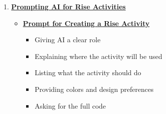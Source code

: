 \documentclass{article}
\begin{document}
\begin{enumerate}[leftmargin=1.2cm, itemsep=8pt]
\begin{itemize}[leftmargin=0.8cm, itemsep=6pt]
          \item \hyperref[subsec:add-code-rise]{\textbf{Adding Code Directly in Rise}}
                \begin{itemize}[leftmargin=0.8cm, itemsep=3pt]
                  \item Where to find the code option in Rise
                  \item Adding code directly into the Rise editor
                  \item Viewing the activity output in Rise
                  \item Adjusting the CSS to match the lesson design
                \end{itemize}

          \item \hyperref[subsec:upload-project-rise]{\textbf{Uploading a Project File in Rise}}
                \begin{itemize}[leftmargin=0.8cm, itemsep=3pt]
                  \item Uploading the activity as a project file
                  \item Using  as the main file
                  \item When this option is useful
                  \item Testing the project before uploading it to Rise
                \end{itemize}

        \end{itemize}

  \item \hyperref[sec:prompting-ai]{\textbf{\Bitter\textcolor{naranja}{Prompting AI for Rise Activities}}}

        \begin{itemize}[leftmargin=0.8cm, itemsep=6pt]

          \item \hyperref[subsec:prompt-create-rise-activity]{\textbf{Prompt for Creating a Rise Activity}}
                \begin{itemize}[leftmargin=0.8cm, itemsep=3pt]
                  \item Giving AI a clear role
                  \item Explaining where the activity will be used
                  \item Listing what the activity should do
                  \item Providing colors and design preferences
                  \item Asking for the full code
                \end{itemize}


\end{itemize}
\end{enumerate}
\end{document}

